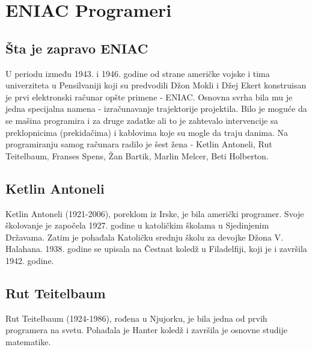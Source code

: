 \documentclass[a4paper,12pt]{article}
\begin{document}
\newpage
\section{ENIAC Programeri}

\subsection{Šta je zapravo ENIAC}
\begin{flushleft}

U periodu između 1943. i 1946. godine od strane američke vojske i tima univerziteta u Pensilvaniji koji su predvodili Džon Mokli i Džej Ekert konstruisan je prvi elektronski računar opšte primene - ENIAC. Osnovna svrha bila mu je jedna specijalna namena - izračunavanje trajektorije projektila. Bilo je moguće da se mašina programira i za druge zadatke ali to je zahtevalo intervencije sa preklopnicima (prekidačima) i kablovima koje su mogle da traju danima. Na programiranju samog računara radilo je šest žena - Ketlin Antoneli, Rut Teitelbaum, Franses Spens, Žan Bartik, Marlin Melcer, Beti Holberton.

\end{flushleft}

\subsection{Ketlin Antoneli}
\begin{flushleft}

Ketlin Antoneli (1921-2006), poreklom iz Irske, je bila američki programer. Svoje školovanje je započela 1927. godine u katoličkim školama u Sjedinjenim Državama. Zatim je pohađala Katoličku srednju školu za devojke Džona V. Halahana. 1938. godine se upisala na Čestnat koledž u Filadelfiji, koji je i završila 1942. godine.

\end{flushleft}

\subsection{Rut Teitelbaum}
\begin{flushleft}

Rut Teitelbaum (1924-1986), rođena u Njujorku, je bila jedna od prvih programera na svetu. Pohađala je Hanter koledž i završila je osnovne studije matematike.

\end{flushleft}
\end{document}
